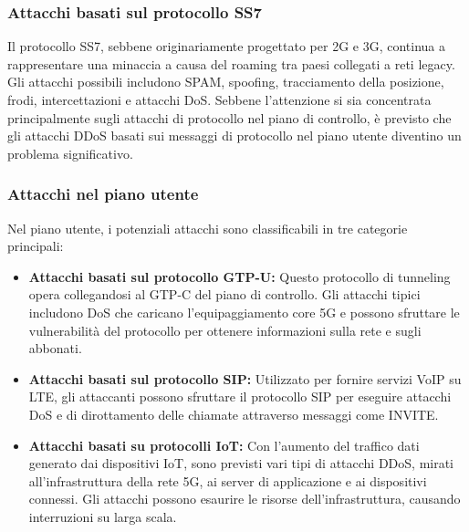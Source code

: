 \documentclass[english]{article}
\begin{document}
\subsubsection{Attacchi basati sul protocollo SS7}
Il protocollo SS7, sebbene originariamente progettato per 2G e 3G, continua a
rappresentare una minaccia a causa del roaming tra paesi collegati a reti
legacy. Gli attacchi possibili includono SPAM, spoofing, tracciamento della
posizione, frodi, intercettazioni e attacchi DoS. Sebbene l'attenzione si sia
concentrata principalmente sugli attacchi di protocollo nel piano di controllo,
è previsto che gli attacchi DDoS basati sui messaggi di protocollo nel piano
utente diventino un problema significativo.

\subsubsection{Attacchi nel piano utente}
Nel piano utente, i potenziali attacchi sono classificabili in tre categorie
principali:

\begin{itemize}
	\item \textbf{Attacchi basati sul protocollo GTP-U:} Questo protocollo di tunneling opera collegandosi al GTP-C del piano di controllo. Gli attacchi tipici includono DoS che caricano l'equipaggiamento core 5G e possono sfruttare le vulnerabilità del protocollo per ottenere informazioni sulla rete e sugli abbonati.

	\item \textbf{Attacchi basati sul protocollo SIP:} Utilizzato per fornire servizi VoIP su LTE, gli attaccanti possono sfruttare il protocollo SIP per eseguire attacchi DoS e di dirottamento delle chiamate attraverso messaggi come INVITE.\@

	\item \textbf{Attacchi basati su protocolli IoT:} Con l'aumento del traffico dati generato dai dispositivi IoT, sono previsti vari tipi di attacchi DDoS, mirati all'infrastruttura della rete 5G, ai server di applicazione e ai dispositivi connessi. Gli attacchi possono esaurire le risorse dell'infrastruttura, causando interruzioni su larga scala.
\end{itemize}
\end{document}
